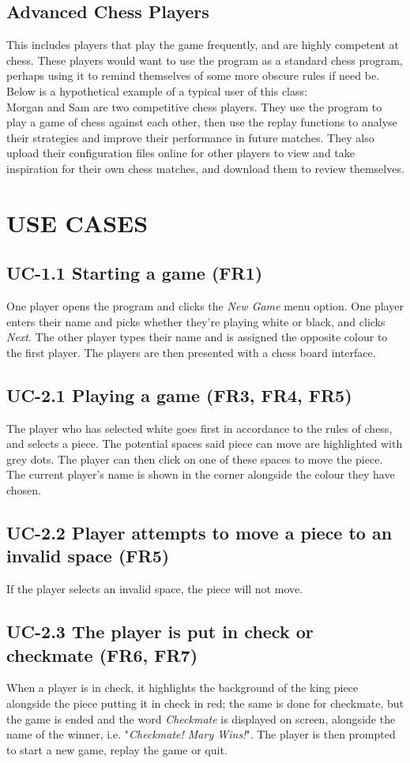\documentclass{project}
\begin{document}
\subsection{Advanced Chess Players}
This includes players that play the game frequently, and are highly competent at chess. These players would want to use the program as a standard chess program, perhaps using it to remind themselves of some more obscure rules if need be. Below is a hypothetical example of a typical user of this class:\\
Morgan and Sam are two competitive chess players. They use the program to play a game of chess against each other, then use the replay functions to analyse their strategies and improve their performance in future matches. They also upload their configuration files online for other players to view and take inspiration for their own chess matches, and download them to review themselves.
\section{USE CASES}
\subsection{UC-1.1 Starting a game (FR1)}
One player opens the program and clicks the \emph{New Game} menu option. One player enters their name and picks whether they're playing white or black, and clicks \emph{Next}. The other player types their name and is assigned the opposite colour to the first player. The players are then presented with a chess board interface.
\subsection{UC-2.1 Playing a game (FR3, FR4, FR5)}
The player who has selected white goes first in accordance to the rules of chess, and selects a piece. The potential spaces said piece can move are highlighted with grey dots. The player can then click on one of these spaces to move the piece. The current player's name is shown in the corner alongside the colour they have chosen.
\subsection{UC-2.2 Player attempts to move a piece to an invalid space (FR5)}
If the player selects an invalid space, the piece will not move.
\subsection{UC-2.3 The player is put in check or checkmate (FR6, FR7)}
When a player is in check, it highlights the background of the king piece alongside the piece putting it in check in red; the same is done for checkmate, but the game is ended and the word \emph{Checkmate} is displayed on screen, alongside the name of the winner, i.e. "\emph{Checkmate! Mary Wins!}". The player is then prompted to start a new game, replay the game or quit.
\end{document}
